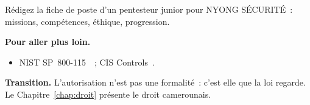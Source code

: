 \begin{boxexo}[title={\ding{45}\quad Exercice~1.10. Le profil \niveauexpert}]
Rédigez la fiche de poste d'un pentesteur junior pour NYONG SÉCURITÉ~:
missions, compétences, éthique, progression.
\end{boxexo}

\bigskip

\begin{boxinfo}
\textbf{Pour aller plus loin.}
\begin{itemize}
    \item NIST SP~800-115~\cite{nist800115}~; CIS Controls~\cite{cis2021controls}.
\end{itemize}
\end{boxinfo}

\begin{boxinfo}
\textbf{Transition.} L'autorisation n'est pas une formalité~: c'est elle
que la loi regarde. Le Chapitre~\ref{chap:droit} présente le droit
camerounais.
\end{boxinfo}
